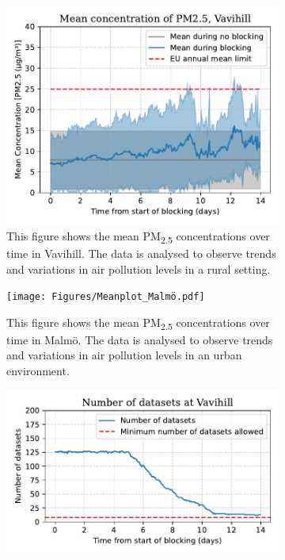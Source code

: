 \begin{figure}[H]
    \centering
    \begin{subfigure}[b]{0.49\textwidth}
        \centering
        \includegraphics[width=\textwidth]{Figures/Meanplot_Vavihill.pdf}
        \caption{This figure shows the mean PM\textsubscript{2.5} concentrations over time in Vavihill. The data is analysed to observe trends and variations in air pollution levels in a rural setting.}
        \label{fig:Meanplot_Vavihill}
    \end{subfigure}
    \hfill
    \begin{subfigure}[b]{0.49\textwidth}
        \centering
        \texttt{[image: Figures/Meanplot\_Malmö.pdf]}
        \caption{This figure shows the mean PM\textsubscript{2.5} concentrations over time in Malmö. The data is analysed to observe trends and variations in air pollution levels in an urban environment.}
        \label{fig:Meanplot_Malmö}
    \end{subfigure}
    \begin{subfigure}[b]{0.49\textwidth}
        \centering
        \includegraphics[width=\textwidth]{Figures/Meanplotinfo_Vavihill.pdf}

\end{subfigure}
\end{figure}
